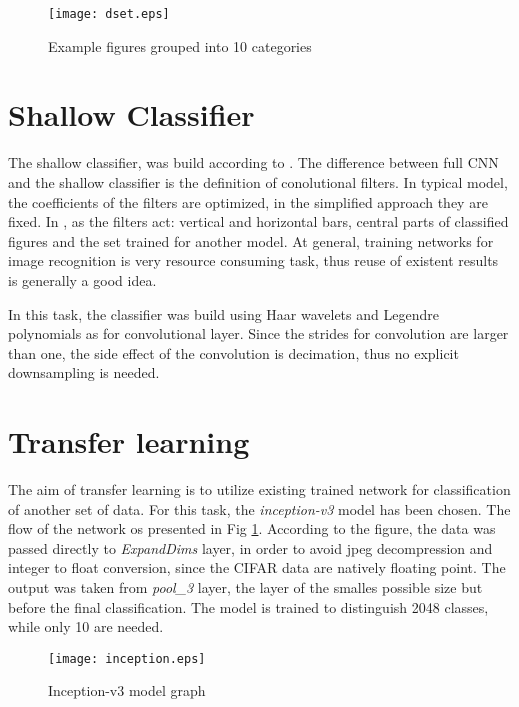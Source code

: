 \documentclass{article}
\begin{document}
\begin{figure}[!hbt]
  \centering
  \texttt{[image: dset.eps]}
  \caption{Example figures grouped into 10 categories}
\end{figure}


\section{Shallow Classifier}
The shallow classifier, was build according to \cite{shallow}. The difference
between full CNN and the shallow classifier is the definition of conolutional
filters. In typical model, the coefficients of the filters are optimized,
in the simplified approach they are fixed. In \cite{shallow}, as
the filters act: vertical and horizontal bars, central parts of classified
figures and the set trained for another model. At general, training networks
for image recognition is very resource consuming task, thus reuse of existent
results is generally a good idea.

In this task, the classifier was build using Haar wavelets and Legendre polynomials
as for convolutional layer. Since the strides for convolution are larger than one,
the side effect of the convolution is decimation, thus no explicit downsampling is
needed.

\section{Transfer learning}

The aim of transfer learning is to utilize existing trained network for classification
of another set of data. For this task, the {\em inception-v3} model has been chosen.
The flow of the network os presented in Fig \ref{incept}. According to the
figure, the data was passed directly to {\em ExpandDims} layer, in order to avoid
jpeg decompression and integer to float conversion, since the CIFAR data are
natively floating point. The output was taken from {\em pool\_3} layer,
the layer of the smalles possible size but before the final classification.
The model is trained to distinguish 2048 classes, while only 10 are needed.


\begin{figure}[!hbt]
  \centering
  \texttt{[image: inception.eps]}
  \caption{\label{incept}Inception-v3 model graph}
\end{figure}

%
%
\end{document}
